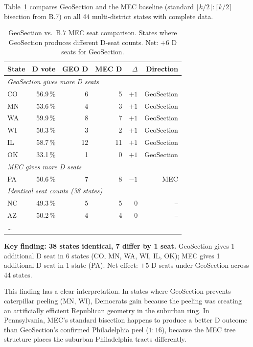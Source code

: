 Table~\ref{tab:head-to-head} compares GeoSection and the MEC baseline
(standard $\lfloor k/2\rfloor:\lceil k/2\rceil$ bisection from B.7)
on all 44 multi-district states with complete data.

\begin{table}[h]
\centering
\caption{GeoSection vs.\ B.7 MEC seat comparison.
  States where GeoSection produces different D-seat counts.
  Net: $+6$ D seats for GeoSection.}
\label{tab:head-to-head}
\begin{tabular}{lrrrrr}
\toprule
State & D vote & GEO D & MEC D & $\Delta$ & Direction \\
\midrule
\multicolumn{6}{l}{\textit{GeoSection gives more D seats}} \\
CO  & 56.9\,\% & 6 & 5 & $+1$ & GeoSection \\
MN  & 53.6\,\% & 4 & 3 & $+1$ & GeoSection \\
WA  & 59.9\,\% & 8 & 7 & $+1$ & GeoSection \\
WI  & 50.3\,\% & 3 & 2 & $+1$ & GeoSection \\
IL  & 58.7\,\% & 12 & 11 & $+1$ & GeoSection \\
OK  & 33.1\,\% & 1 & 0 & $+1$ & GeoSection \\
\midrule
\multicolumn{6}{l}{\textit{MEC gives more D seats}} \\
PA  & 50.6\,\% & 7 & 8 & $-1$ & MEC \\
\midrule
\multicolumn{6}{l}{\textit{Identical seat counts (38 states)}} \\
NC  & 49.3\,\% & 5 & 5 & 0 & -- \\
AZ  & 50.2\,\% & 4 & 4 & 0 & -- \\
\ldots & & & & & \\
\bottomrule
\end{tabular}
\end{table}

\noindent\textbf{Key finding: 38 states identical, 7 differ by 1 seat.}
GeoSection gives 1 additional D seat in 6 states (CO, MN, WA, WI, IL, OK);
MEC gives 1 additional D seat in 1 state (PA).
Net effect: $+5$ D seats under GeoSection across 44 states.

This finding has a clear interpretation.
In states where GeoSection prevents caterpillar peeling (MN, WI), Democrats
gain because the peeling was creating an artificially efficient Republican
geometry in the suburban ring.
In Pennsylvania, MEC's standard bisection happens to produce a better D outcome
than GeoSection's confirmed Philadelphia peel ($1:16$), because the MEC tree
structure places the suburban Philadelphia tracts differently.


